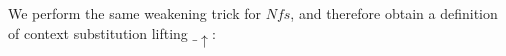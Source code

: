 We perform the same weakening trick for $Nfs$, and therefore obtain a definition of context substitution lifting $\_\uparrow$:

\begin{code}[hide]%
\>[0]\AgdaSpace{}%
\AgdaSymbol{:}\AgdaSpace{}%
\AgdaSymbol{(}\AgdaSpace{}%
\AgdaSymbol{:}\AgdaSpace{}%
\AgdaSpace{}%
\AgdaSpace{}%
\AgdaSymbol{)}\AgdaSpace{}%
\AgdaSpace{}%
\AgdaSpace{}%
\AgdaSymbol{(}\AgdaSpace{}%
\AgdaOperator{\AgdaFunction{-}}\AgdaSpace{}%
\AgdaSymbol{)}\AgdaSpace{}%
\AgdaSpace{}%
\AgdaSpace{}%
\AgdaSpace{}%
\AgdaSpace{}%
\<%
\\
\>[0]\AgdaSpace{}%
\AgdaSpace{}%
\AgdaSpace{}%
\AgdaSymbol{=}\AgdaSpace{}%
\<%
\\
\>[0]\AgdaSpace{}%
\AgdaSpace{}%
\AgdaSymbol{(}\AgdaSpace{}%
\AgdaOperator{\AgdaInductiveConstructor{,}}\AgdaSpace{}%
\AgdaSymbol{)}\AgdaSpace{}%
\AgdaSymbol{=}\AgdaSpace{}%
\AgdaSpace{}%
\AgdaSpace{}%
\AgdaSpace{}%
\AgdaOperator{\AgdaInductiveConstructor{,}}\AgdaSpace{}%
\AgdaSpace{}%
\AgdaSpace{}%
\<%
\\
%
\\[\AgdaEmptyExtraSkip]%
\>[0]\AgdaSpace{}%
\AgdaSymbol{:}\AgdaSpace{}%
\AgdaSpace{}%
\AgdaSpace{}%
\AgdaSpace{}%
\AgdaSpace{}%
\AgdaSpace{}%
\AgdaSymbol{(}\AgdaSpace{}%
\AgdaSpace{}%
\AgdaSymbol{)}\AgdaSpace{}%
\AgdaSymbol{(}\AgdaSpace{}%
\AgdaSpace{}%
\AgdaSymbol{)}\<%
\\
\>[0]\AgdaSpace{}%
\AgdaSpace{}%
\AgdaSymbol{=}\AgdaSpace{}%
\AgdaSpace{}%
\AgdaSpace{}%
\AgdaSpace{}%
\AgdaOperator{\AgdaInductiveConstructor{,}}\AgdaSpace{}%
\AgdaSpace{}%
\<%
\end{code}

